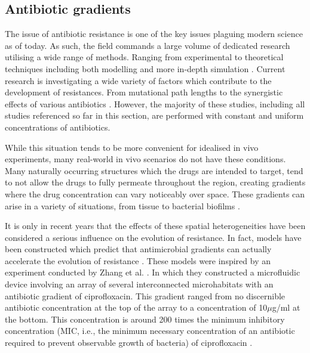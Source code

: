 \documentclass[a4paper,12pt]{article}
\begin{document}
\subsection{Antibiotic gradients}
The issue of antibiotic resistance is one of the key issues plaguing modern science as of today.  As such, the field commands a 
large volume of dedicated research utilising a wide range of methods.  Ranging from experimental to theoretical techniques including both modelling and 
more in-depth simulation \cite{bioref:chait-interactions, bioref:Wang-treatment-tradeoff, bioref:Torella-optimal-drug-synergy}.  Current research is 
investigating a wide variety of factors which contribute to the development of resistances.  From mutational path lengths \cite{bioref:marvig-transmiss-lineage} to 
the synergistic effects of various antibiotics \cite{bioref:Liu-baicalin-synergy}.  However, the majority of these studies, including all studies referenced
so far in this section, are performed with constant and uniform concentrations of antibiotics.

While this situation tends to be more convenient for idealised in vivo experiments, many real-world in vivo scenarios do not have these conditions. Many naturally 
occurring structures which the drugs are intended to target, tend to not allow the drugs to fully permeate throughout
the region, creating gradients where the drug concentration can vary noticeably over space.  These gradients can arise in a variety of 
situations, from tissue \cite{bioref:minelli-peflox-penet} to bacterial biofilms \cite{bioref:Kim-biofilm-antibio-grad-2010}.

It is only in recent years that the effects of these spatial heterogeneities have been considered a serious influence on the evolution of resistance. 
In fact, models have been constructed which predict that antimicrobial gradients can actually accelerate the evolution of resistance \cite{bioref:Hermsen-source-and-sink}.
These models were inspired by an experiment conducted by Zhang et al. \cite{bioref:Zhang-effects-of-antibio-grad}.  In which they constructed a microfluidic device involving an array of 
several interconnected microhabitats with an antibiotic gradient of ciprofloxacin.  This gradient ranged from no discernible antibiotic concentration at the top of the array to 
a concentration of 10$\mu$g/ml at the bottom.  This concentration is around 200 times the minimum inhibitory concentration (MIC, i.e., the minimum necessary concentration of 
an antibiotic required to prevent observable growth of bacteria) of ciprofloxacin \cite{bioref:ciprofloxa-mic}.
\end{document}
